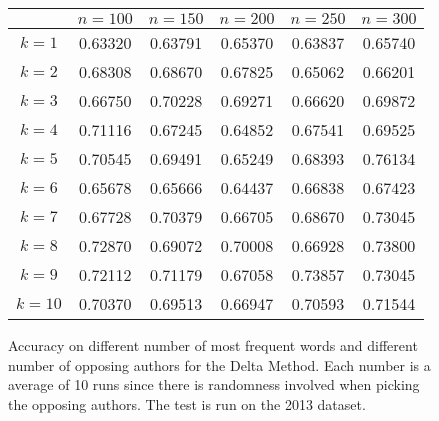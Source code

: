 \begin{figure}
    \centering
    \begin{tabular}{c|ccccc}
               & $n=100$ & $n=150$ & $n=200$ & $n=250$ & $n=300$ \\
        \hline
        $k=1$  & 0.63320 & 0.63791 & 0.65370 & 0.63837 & 0.65740 \\
        $k=2$  & 0.68308 & 0.68670 & 0.67825 & 0.65062 & 0.66201 \\
        $k=3$  & 0.66750 & 0.70228 & 0.69271 & 0.66620 & 0.69872 \\
        $k=4$  & 0.71116 & 0.67245 & 0.64852 & 0.67541 & 0.69525 \\
        $k=5$  & 0.70545 & 0.69491 & 0.65249 & 0.68393 & 0.76134 \\
        $k=6$  & 0.65678 & 0.65666 & 0.64437 & 0.66838 & 0.67423 \\
        $k=7$  & 0.67728 & 0.70379 & 0.66705 & 0.68670 & 0.73045 \\
        $k=8$  & 0.72870 & 0.69072 & 0.70008 & 0.66928 & 0.73800 \\
        $k=9$  & 0.72112 & 0.71179 & 0.67058 & 0.73857 & 0.73045 \\
        $k=10$ & 0.70370 & 0.69513 & 0.66947 & 0.70593 & 0.71544
    \end{tabular}
    \caption{Accuracy on different number of most frequent words and different
        number of opposing authors for the Delta Method. Each number is a
        average of 10 runs since there is randomness involved when picking the
        opposing authors. The test is run on the 2013 dataset.}
    \label{fig:delta_pan_2013_res}
\end{figure}

